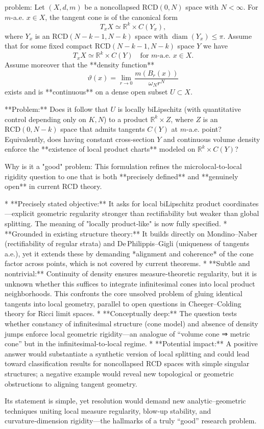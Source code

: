 problem:  
Let \((X,d,m)\) be a noncollapsed \(\mathrm{RCD}(0,N)\) space with \(N<\infty\).  
For \(m\)-a.e. \(x \in X\), the tangent cone is of the canonical form  
\[
T_xX \simeq \mathbb{R}^k \times C(Y_x),
\]
where \(Y_x\) is an \(\mathrm{RCD}(N-k-1,N-k)\) space with \(\operatorname{diam}(Y_x)\le \pi\).  
Assume that for some fixed compact \(\mathrm{RCD}(N-k-1,N-k)\) space \(Y\) we have  
\[
T_xX \simeq \mathbb{R}^k \times C(Y)
\quad\text{for } m\text{-a.e. }x\in X.
\]
Assume moreover that the **density function**
\[
\vartheta(x) = \lim_{r\to 0} \frac{m(B_r(x))}{\omega_N r^N}
\]
exists and is **continuous** on a dense open subset \(U\subset X\).  

**Problem:**  
Does it follow that \(U\) is locally biLipschitz (with quantitative control depending only on \(K,N\)) to a product \(\mathbb{R}^k\times Z\),  
where \(Z\) is an \(\mathrm{RCD}(0,N-k)\) space that admits tangents \(C(Y)\) at \(m\)-a.e. point?  
Equivalently, does having constant cross‑section \(Y\) and continuous volume density enforce the **existence of local product charts** modeled on \(\mathbb{R}^k\times C(Y)\)?  

Why is it a "good" problem:  
This formulation refines the microlocal‑to‑local rigidity question to one that is both **precisely defined** and **genuinely open** in current RCD theory.  

* **Precisely stated objective:** It asks for local biLipschitz product coordinates—explicit geometric regularity stronger than rectifiability but weaker than global splitting. The meaning of "locally product‑like" is now fully specified.  
* **Grounded in existing structure theory:** It builds directly on Mondino–Naber (rectifiability of regular strata) and De Philippis–Gigli (uniqueness of tangents a.e.), yet it extends these by demanding *alignment and coherence* of the cone factor across points, which is not covered by current theorems.  
* **Subtle and nontrivial:** Continuity of density ensures measure‑theoretic regularity, but it is unknown whether this suffices to integrate infinitesimal cones into local product neighborhoods. This confronts the core unsolved problem of gluing identical tangents into local geometry, parallel to open questions in Cheeger–Colding theory for Ricci limit spaces.  
* **Conceptually deep:** The question tests whether constancy of infinitesimal structure (cone model) and absence of density jumps enforce local geometric rigidity—an analogue of “volume cone ⇒ metric cone” but in the infinitesimal‑to‑local regime.  
* **Potential impact:** A positive answer would substantiate a synthetic version of local splitting and could lead toward classification results for noncollapsed RCD spaces with simple singular structures; a negative example would reveal new topological or geometric obstructions to aligning tangent geometry.  

Its statement is simple, yet resolution would demand new analytic–geometric techniques uniting local measure regularity, blow‑up stability, and curvature‑dimension rigidity—the hallmarks of a truly “good” research problem.